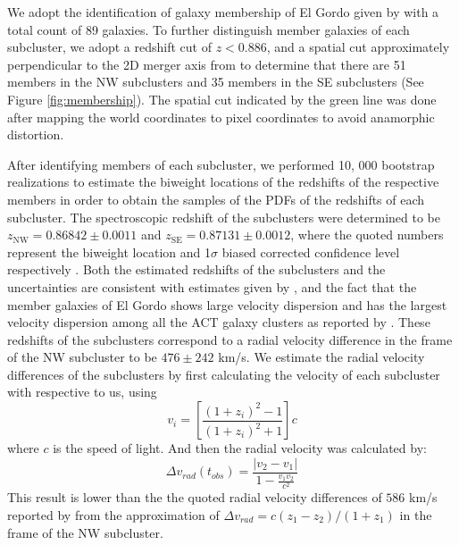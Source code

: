 
We adopt the identification of galaxy membership of El Gordo given by
 with a total count of 89 galaxies.
To further distinguish member galaxies of each subcluster, we adopt a
redshift cut of $z < 0.886$, and a spatial cut approximately perpendicular
to the 2D merger axis from  to determine that
there are 51 members in the NW subclusters and 35 members in the SE subclusters (See Figure
\ref{fig:membership}). 
The spatial cut indicated by the green line was done after
mapping the world coordinates to pixel coordinates to avoid anamorphic distortion. 

After identifying members of each subcluster, we performed 10, 000 bootstrap realizations to estimate the biweight
locations of the redshifts of the respective members in order to obtain the
samples of the PDFs of the redshifts of each subcluster. 
The spectroscopic redshift of the subclusters were
determined to be 
$z_{\mathrm{NW}} = 0.86842 \pm 0.0011$ and 
$z_{\mathrm{SE}} = 0.87131 \pm 0.0012$, where the quoted numbers represent the
biweight location and 1$\sigma$ biased corrected confidence level
respectively \citep{Beers90}.  
Both the estimated redshifts of the subclusters and the uncertainties are
consistent with estimates given by \citealt{Sifon13}, and the fact that the
member galaxies of El
Gordo shows large velocity dispersion and has the largest velocity
dispersion among all the ACT galaxy clusters as reported by
. These redshifts of the subclusters correspond to a
radial velocity difference in the frame of the NW subcluster
to be $476 \pm 242 $ km/s. We estimate the radial velocity differences of the
subclusters by first calculating the velocity of each subcluster with
respective to us, using  
\begin{equation}
	v_i = \left[ \frac{(1+z_i)^2 - 1 }{(1+z_i)^2 + 1 }\right]c
\end{equation}
where $c$ is the speed of light. And then the radial velocity was calculated
by: 
\begin{equation}
	\Delta v_{rad}(t_{obs}) = \frac{|v_2 - v_1|}{1-\frac{v_1 v_2}{c^2}}
\end{equation}
This result is lower than the the quoted radial velocity differences of
$586$
km/s reported by  from the approximation of $\Delta v_{rad}
= c(z_1 - z_2) / (1 + z_1)$ in the frame of the NW subcluster. 


